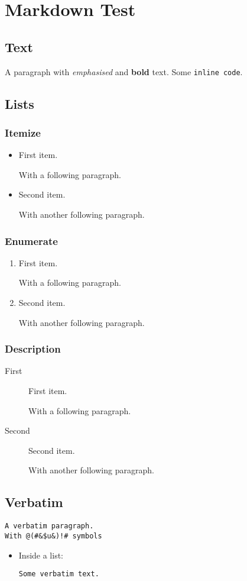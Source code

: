 \documentclass[
  text,
  markdown
]{internet}
\begin{document}
\section{Markdown Test}

\subsection{Text}

A paragraph with \emph{emphasised} and \textbf{bold} text.
Some \verb+inline code+.

\subsection{Lists}

\subsubsection{Itemize}

\begin{itemize}
\item First item.

With a following paragraph.

\item Second item.

With another following paragraph.
\end{itemize}

\subsubsection{Enumerate}

\begin{enumerate}
\item First item.

With a following paragraph.

\item Second item.

With another following paragraph.
\end{enumerate}

\subsubsection{Description}

\begin{description}
\item[First] First item.

With a following paragraph.

\item[Second] Second item.

With another following paragraph.
\end{description}

\subsection{Verbatim}

\begin{verbatim}
A verbatim paragraph.
With @(#&$u&)!# symbols
\end{verbatim}

\begin{itemize}
\item Inside a list:

\begin{verbatim}
Some verbatim text.
\end{verbatim}

\end{itemize}
\end{document}
